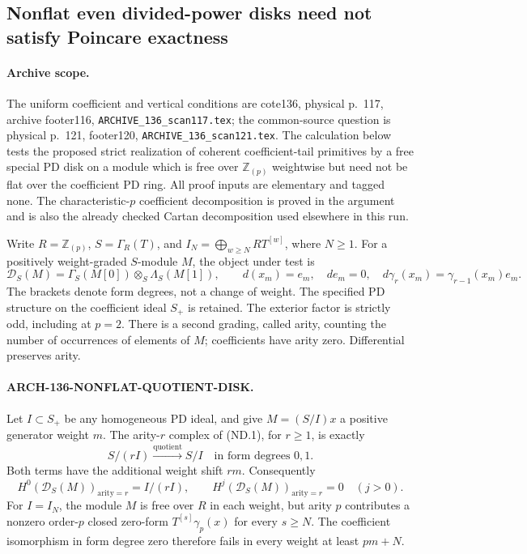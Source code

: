 \subsection{Nonflat even divided-power disks need not satisfy Poincare exactness}
\label{arch136:nonflat-even-disk}

\paragraph{Archive scope.}
The uniform coefficient and vertical conditions are cote136,
physical p.~117, archive footer116,
\texttt{ARCHIVE\_136\_scan117.tex}; the common-source question is
physical p.~121, footer120, \texttt{ARCHIVE\_136\_scan121.tex}.
The calculation below tests the proposed strict realization of
coherent coefficient-tail primitives by a free special PD disk on
a module which is free over \(\mathbb Z_{(p)}\) weightwise but
need not be flat over the coefficient PD ring. All proof inputs
are elementary and tagged none. The characteristic-\(p\)
coefficient decomposition is proved in the argument and is also
the already checked Cartan decomposition used elsewhere in this run.

Write \(R=\mathbb Z_{(p)}\), \(S=\Gamma_R(T)\), and
\(I_N=\bigoplus_{w\geq N}R T^{[w]}\), where \(N\geq1\).
For a positively weight-graded \(S\)-module \(M\), the object
under test is
\[
 \mathscr D_S(M)=\Gamma_S(M[0])\otimes_S\Lambda_S(M[1]),
 \qquad d(x_m)=e_m,\quad de_m=0,\quad
 d\gamma_r(x_m)=\gamma_{r-1}(x_m)e_m.                 \tag{ND.1}
\]
The brackets denote form degrees, not a change of weight.
The specified PD structure on the coefficient ideal \(S_+\)
is retained. The exterior factor is strictly odd, including at
\(p=2\). There is a second grading, called arity, counting the
number of occurrences of elements of \(M\); coefficients have
arity zero. Differential preserves arity.

\paragraph{ARCH-136-NONFLAT-QUOTIENT-DISK.}
Let \(I\subset S_+\) be any homogeneous PD ideal, and give
\(M=(S/I)x\) a positive generator weight \(m\).
The arity-\(r\) complex of (ND.1), for \(r\geq1\), is exactly
\[
             S/(rI)\xrightarrow{\mathrm{quotient}}S/I
                  \quad\text{in form degrees }0,1.      \tag{ND.2}
\]
Both terms have the additional weight shift \(rm\).
Consequently
\[
 H^0(\mathscr D_S(M))_{\mathrm{arity}=r}=I/(rI),
 \qquad H^j(\mathscr D_S(M))_{\mathrm{arity}=r}=0
                                      \quad(j>0).        \tag{ND.3}
\]
For \(I=I_N\), the module \(M\) is free over \(R\) in
each weight, but arity \(p\) contributes a nonzero order-\(p\)
closed zero-form \(T^{[s]}\gamma_p(x)\) for every \(s\geq N\).
The coefficient isomorphism in form degree zero therefore fails
in every weight at least \(pm+N\).

